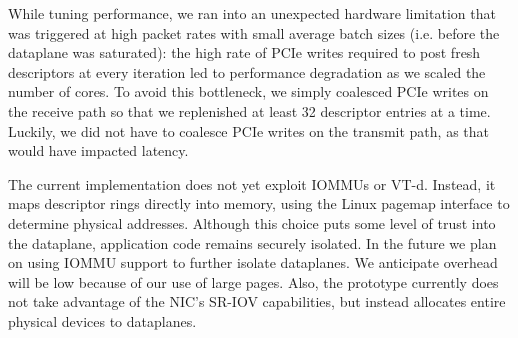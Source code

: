 %


While tuning \ix performance, we ran into an unexpected hardware limitation
that was triggered at high packet rates with small average batch sizes 
(i.e. before the dataplane was saturated): 
the high rate of PCIe writes required to post fresh
descriptors at every iteration led to performance degradation as we
scaled the number of cores.  To avoid this bottleneck, we
simply coalesced PCIe writes on the receive path so that we
replenished at least 32 descriptor entries at a time.  Luckily, we did
not have to coalesce PCIe writes on the transmit path, as that would
have impacted latency.


\begin{comment}
  \myparagraph{Using interrupts as a fallback:} Some applications
  service requests that require extended intervals of compute time. We
  intend for these requests to be delegated to from elastic threads to
  background threads in order to ensure that elastic threads remain
  responsive.  However, \ix can also be modified to better tolerate
  unanticipated delays during application processing in elastic
  threads.  One option would be to use interrupts as a fallback
  mode. On the receive side, the NIC would fire an interrupt whenever
  the recieve descriptor ring is almost full. The dataplane could then
  move packets from the receive ring to a software structure, averting
  buffer underrun. On the transmit side, NIC would fire an interrupt
  whenever the transmit ring becomes empty so that it can be
  refilled. Such an interrupt would only need to be armed when there
  is additional transmit data pending. A desirable property of this
  approach is that neither interrupt would be triggered as long as
  elastic threads are sufficiently responsive, but if an elastic
  thread misbehaves, the \ix dataplane would be able to regain control
  and catch up on network processing.
\end{comment}


 The current \ix
implementation does not yet exploit IOMMUs or VT-d. Instead, it maps
descriptor rings directly into \ix memory, using the Linux pagemap
interface to determine physical addresses.  Although this choice puts
some level of trust into the \ix dataplane, application code remains
securely isolated. In the future we plan on using IOMMU support to
further isolate \ix dataplanes. We anticipate overhead will be low
because of our use of large pages.  Also, the \ix prototype currently
does not take advantage of the NIC's SR-IOV capabilities, but instead
allocates entire physical devices to dataplanes.

